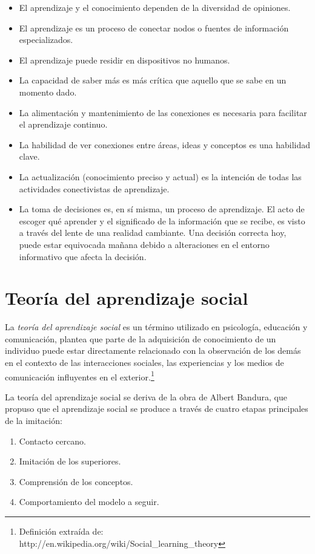 \begin{itemize}
\item El aprendizaje y el conocimiento dependen de la diversidad de opiniones.
\item El aprendizaje es un proceso de conectar nodos o fuentes de información
especializados.
\item El aprendizaje puede residir en dispositivos no humanos.
\item La capacidad de saber más es más crítica que aquello que se sabe en un
momento dado.
\item La alimentación y mantenimiento de las conexiones es necesaria para
facilitar el aprendizaje continuo.
\item La habilidad de ver conexiones entre áreas, ideas y conceptos es una
habilidad clave.
\item La actualización (conocimiento preciso y actual) es la intención de todas
las actividades conectivistas de aprendizaje.
\item La toma de decisiones es, en sí misma, un proceso de aprendizaje. El acto
de escoger qué aprender y el significado de la información que se recibe, es
visto a través del lente de una realidad cambiante. Una decisión correcta hoy,
puede estar equivocada mañana debido a alteraciones en el entorno informativo
que afecta la decisión. 
\end{itemize}

\section{Teoría del aprendizaje social}

La \emph{teoría del aprendizaje social} es un término utilizado en psicología,
educación y comunicación, plantea que parte de la adquisición de conocimiento
de un individuo puede estar directamente relacionado con la observación de los
demás en el contexto de las interacciones sociales, las experiencias y los
medios de comunicación influyentes en el exterior.\footnote{Definición extraída
de: http://en.wikipedia.org/wiki/Social\_learning\_theory}

La teoría del aprendizaje social se deriva de la obra de Albert Bandura, que
propuso que el aprendizaje social se produce a través de cuatro etapas
principales de la imitación:

\begin{enumerate}
\item Contacto cercano.
\item Imitación de los superiores.
\item Comprensión de los conceptos.
\item Comportamiento del modelo a seguir.
\end{enumerate}

